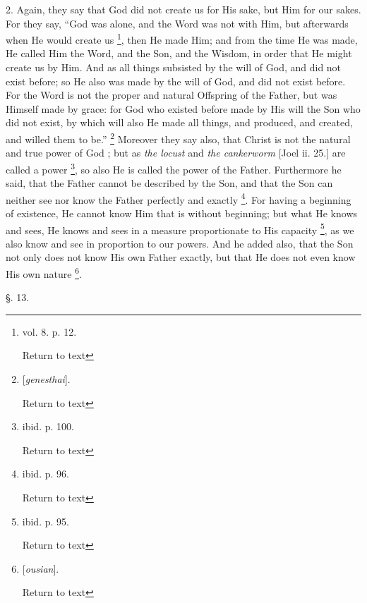 2. Again, they say that God did not create us for
His sake, but Him for our sakes. For they say, ``God was alone, and the
Word was not with Him, but afterwards when He would create us \footnote{vol. 8. p. 12.

Return to text}, then He made Him; and from the time He was made, He called Him
the Word, and the Son, and the Wisdom, in order that He might create
us by Him. And as all things subsisted by the will of God, and did not
exist before; so He also was made by the will of God, and did not
exist before. For the Word is not the proper and natural Offspring of
the Father, but was Himself made by grace: for God who existed before
made by His will the Son who did not exist, by which will also He made
all things, and produced, and created, and willed them to be.'' \footnote{[\emph{genesthai}].

Return to text} Moreover they say also, that Christ is not the natural and true
power of God ; but as \emph{the locust} and \emph{the cankerworm}
[Joel ii. 25.] are called a power \footnote{ibid. p. 100.

Return to text},
so also He is called the power of the Father. Furthermore he said,
that the Father cannot be described by the Son, and that the Son can
neither see nor know the Father perfectly and exactly \footnote{ibid. p. 96.

Return to text}. For having a beginning of existence, He cannot know Him that is
without beginning; but what He knows and sees, He knows and sees in a
measure proportionate to His capacity \footnote{ibid. p. 95.

Return to text}, as we also know and see in proportion to our powers. And he added
also, that the Son not only does not know His own Father exactly, but
that He does not even know His own nature \footnote{[\emph{ousian}].

Return to text}.

§. 13.

